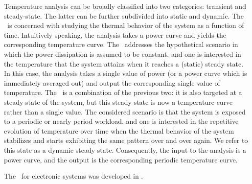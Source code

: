 Temperature analysis can be broadly classified into two categories: transient and steady-state.
The latter can be further subdivided into static and dynamic.
The \tta\ is concerned with studying the thermal behavior of the system as a function of time.
Intuitively speaking, the analysis takes a power curve and yields the corresponding temperature curve.
The \sssta\ addresses the hypothetical scenario in which the power dissipation is assumed to be constant, and one is interested in the temperature that the system attains when it reaches a (static) steady state.
In this case, the analysis takes a single value of power (or a power curve which is immediately averaged out) and output the corresponding single value of temperature.
The \dssta\ is a combination of the previous two: it is also targeted at a steady state of the system, but this steady state is now a temperature curve rather than a single value.
The considered scenario is that the system is exposed to a periodic or nearly period workload, and one is interested in the repetitive evolution of temperature over time when the thermal behavior of the system stabilizes and starts exhibiting the same pattern over and over again.
We refer to this state as a dynamic steady state.
Consequently, the input to the analysis is a power curve, and the output is the corresponding periodic temperature curve.

The \dssta\ for electronic systems was developed in \cite{ukhov2012}.
